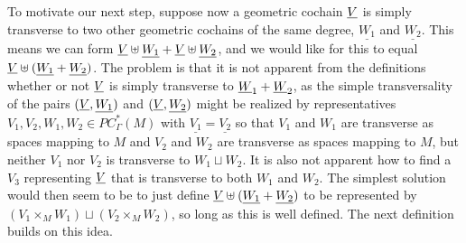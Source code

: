 To motivate our next step, suppose now a geometric cochain $\underline{V}$ is simply transverse to two other geometric cochains of the same degree, $\underline{W_1}$ and $\underline{W_2}$.
This means we can form $\underline{V}\uplus \underline{W_1}+\underline{V}\uplus \underline{W_2}$, and we would like for this to equal $\underline{V}\uplus (\underline{W_1} + \underline{W_2})$.
The problem is that it is not apparent from the definitions whether or not $\underline{V}$ is simply transverse to $\underline{W}_1+\underline{W}_2$, as the simple transversality of the pairs $(\underline{V},\underline{W_1})$ and $(\underline{V},\underline{W_2})$ might be realized by representatives $V_1,V_2, W_1,W_2 \in PC^*_\Gamma(M)$ with $\underline{V_1} = \underline{V_2}$ so that $V_1$ and $W_1$ are transverse as spaces mapping to $M$ and $V_2$ and $W_2$ are transverse as spaces mapping to $M$, but neither $V_1$ nor $V_2$ is transverse to $W_1 \sqcup W_2$.
It is also not apparent how to find a $V_3$ representing $\underline{V}$ that is transverse to both $W_1$ and $W_2$.
The simplest solution would then seem to be to just define
$\underline{V}\uplus (\underline{W_1}+\underline{W_2})$ to be represented by $(V_1 \times_M W_1) \sqcup (V_2 \times_M W_2)$, so long as this is well defined.
The next definition builds on this idea.

